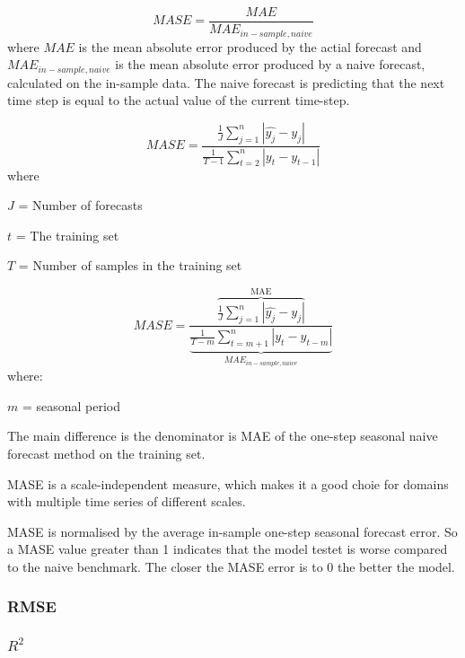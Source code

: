 \begin{displaymath}
  MASE = \frac{MAE}{MAE_{in-sample, naive}}
\end{displaymath}
where $MAE$ is the mean absolute error
produced by the actial forecast and
$MAE_{in-sample, naive} $
is the mean absolute error produced by
a naive forecast, calculated on the in-sample data.
The naive forecast is predicting that the next
time step is equal to the actual value of the current time-step.


\begin{displaymath}
  \label{eq:MASE}
  MASE = \frac{\frac{1}{J} \sum_{j=1}^n |\hat{y_j} - y_j|}{\frac{1}{T-1} \sum_{t=2}^n |y_t - y_{t-1}|}
\end{displaymath}
where

$J$ = Number of forecasts

$t$ = The training set

$T$ = Number of samples in the training set

\begin{equation}
  \label{eq:MASE-Seasonal}
  MASE = \frac{
    \overbrace{
      \frac{1}{J} \sum_{j=1}^n |\hat{y_j} - y_j|}^\text{MAE}}{
    \underbrace{
      \frac{1}{T-m} \sum_{t=m+1}^n |y_t - y_{t-m}|}_\text{$MAE_{in-sample, naive}$}
  }
\end{equation}
where:

$m$ = seasonal period

The main difference is the denominator is MAE
of the one-step seasonal naive forecast method on the training set.

MASE is a scale-independent measure, which makes it
a good choie for domains with multiple time series of
different scales.

MASE is normalised by the average in-sample one-step
seasonal forecast error. So a MASE value greater than
1 indicates that the model testet is worse compared
to the naive benchmark.
The closer the MASE error is to 0 the better the model.



\subsubsection{RMSE}

\subsubsection{$R^2$}


